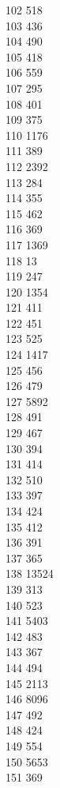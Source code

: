 { 102	518 \\
 103	436 \\
 104	490 \\
 105	418 \\
 106	559 \\
 107	295 \\
 108	401 \\
 109	375 \\
 110	1176 \\
 111	389 \\
 112	2392 \\
 113	284 \\
 114	355 \\
 115	462 \\
 116	369 \\
 117	1369 \\
 118	13 \\
 119	247 \\
 120	1354 \\
 121	411 \\
 122	451 \\
 123	525 \\
 124	1417 \\
 125	456 \\
 126	479 \\
 127	5892 \\
 128	491 \\
 129	467 \\
 130	394 \\
 131	414 \\
 132	510 \\
 133	397 \\
 134	424 \\
 135	412 \\
 136	391 \\
 137	365 \\
 138	13524 \\
 139	313 \\
 140	523 \\
 141	5403 \\
 142	483 \\
 143	367 \\
 144	494 \\
 145	2113 \\
 146	8096 \\
 147	492 \\
 148	424 \\
 149	554 \\
 150	5653 \\
 151	369 \\
}
